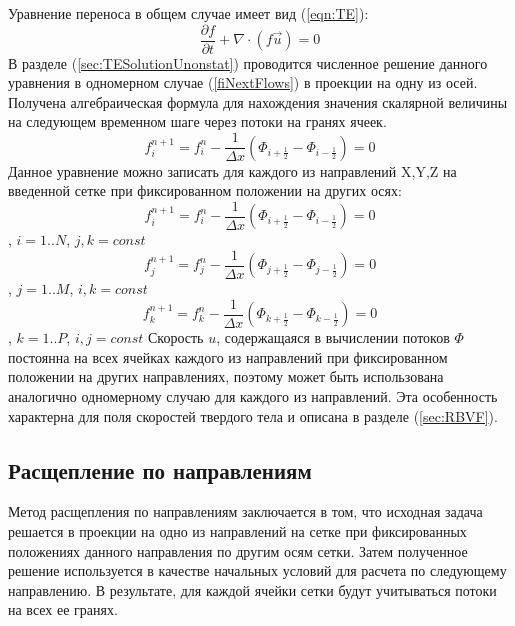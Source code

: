 \documentclass[12pt,a4paper]{article}
\begin{document}
Уравнение переноса в общем случае имеет вид (\ref{eqn:TE}):
\begin{equation}
\frac{\partial f}{\partial t}+\nabla\cdot(f\overrightarrow{u})=0
\end{equation}
В разделе (\ref{sec:TESolutionUnonstat}) проводится численное решение данного уравнения в одномерном случае (\ref{fiNextFlows}) в проекции на одну из осей. Получена алгебраическая формула для нахождения значения скалярной величины на следующем временном шаге через потоки на гранях ячеек.
\begin{equation}
f_i^{n+1}=f_i^n
-
\frac{1}{\Delta x} (
\Phi_{i+\frac{1}{2}}
-
\Phi_{i-\frac{1}{2}}
)=0
\end{equation}
Данное уравнение можно записать для каждого из направлений X,Y,Z на введенной сетке при фиксированном положении на других осях:
\begin{equation}
f_i^{n+1}=f_i^n
-
\frac{1}{\Delta x} (
\Phi_{i+\frac{1}{2}}
-
\Phi_{i-\frac{1}{2}}
)=0
\end{equation}, $i=1..N$, $j,k=const$
\begin{equation}
f_j^{n+1}=f_j^n
-
\frac{1}{\Delta x} (
\Phi_{j+\frac{1}{2}}
-
\Phi_{j-\frac{1}{2}}
)=0
\end{equation}, $j=1..M$, $i,k=const$
\begin{equation}
f_k^{n+1}=f_k^n
-
\frac{1}{\Delta x} (
\Phi_{k+\frac{1}{2}}
-
\Phi_{k-\frac{1}{2}}
)=0
\end{equation}, $k=1..P$, $i,j=const$
Скорость $u$, содержащаяся в вычислении потоков $\Phi$ постоянна на всех ячейках каждого из направлений при фиксированном положении на других направлениях, поэтому может быть использована аналогично одномерному случаю для каждого из направлений. Эта особенность характерна для поля скоростей твердого тела и описана в разделе (\ref{sec:RBVF}).

\subsection{Расщепление по направлениям}
Метод расщепления по направлениям заключается в том, что исходная задача решается в проекции на одно из направлений на сетке при фиксированных положениях данного направления по другим осям сетки. Затем полученное решение используется в качестве начальных условий для расчета по следующему направлению. В результате, для каждой ячейки сетки будут учитываться потоки на всех ее гранях.
\end{document}
